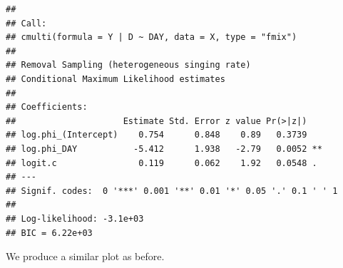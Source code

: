 \documentclass[12pt,]{book}
\newenvironment{Shaded}{\begin{snugshade}}{\end{snugshade}}
\newcommand{\ControlFlowTok}[1]{\textcolor[rgb]{0.13,0.29,0.53}{\textbf{#1}}}
\newcommand{\DataTypeTok}[1]{\textcolor[rgb]{0.13,0.29,0.53}{#1}}
\newcommand{\DecValTok}[1]{\textcolor[rgb]{0.00,0.00,0.81}{#1}}
\newcommand{\KeywordTok}[1]{\textcolor[rgb]{0.13,0.29,0.53}{\textbf{#1}}}
\newcommand{\NormalTok}[1]{#1}
\newcommand{\OperatorTok}[1]{\textcolor[rgb]{0.81,0.36,0.00}{\textbf{#1}}}
\newcommand{\StringTok}[1]{\textcolor[rgb]{0.31,0.60,0.02}{#1}}
\begin{document}
\begin{verbatim}
## 
## Call:
## cmulti(formula = Y | D ~ DAY, data = X, type = "fmix")
## 
## Removal Sampling (heterogeneous singing rate)
## Conditional Maximum Likelihood estimates
## 
## Coefficients:
##                     Estimate Std. Error z value Pr(>|z|)   
## log.phi_(Intercept)    0.754      0.848    0.89   0.3739   
## log.phi_DAY           -5.412      1.938   -2.79   0.0052 **
## logit.c                0.119      0.062    1.92   0.0548 . 
## ---
## Signif. codes:  0 '***' 0.001 '**' 0.01 '*' 0.05 '.' 0.1 ' ' 1 
## 
## Log-likelihood: -3.1e+03 
## BIC = 6.22e+03
\end{verbatim}

We produce a similar plot as before.

\begin{Shaded}
\end{Shaded}
\end{document}
